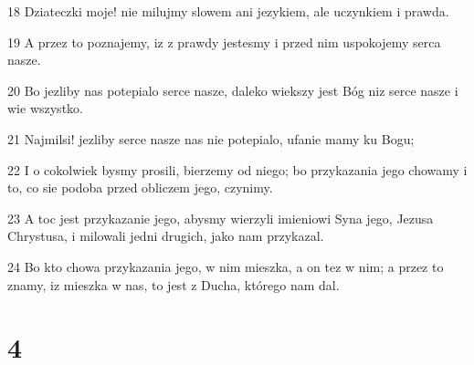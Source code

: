 \par 18 Dziateczki moje! nie milujmy slowem ani jezykiem, ale uczynkiem i prawda.
\par 19 A przez to poznajemy, iz z prawdy jestesmy i przed nim uspokojemy serca nasze.
\par 20 Bo jezliby nas potepialo serce nasze, daleko wiekszy jest Bóg niz serce nasze i wie wszystko.
\par 21 Najmilsi! jezliby serce nasze nas nie potepialo, ufanie mamy ku Bogu;
\par 22 I o cokolwiek bysmy prosili, bierzemy od niego; bo przykazania jego chowamy i to, co sie podoba przed obliczem jego, czynimy.
\par 23 A toc jest przykazanie jego, abysmy wierzyli imieniowi Syna jego, Jezusa Chrystusa, i milowali jedni drugich, jako nam przykazal.
\par 24 Bo kto chowa przykazania jego, w nim mieszka, a on tez w nim; a przez to znamy, iz mieszka w nas, to jest z Ducha, którego nam dal.

\chapter{4}

